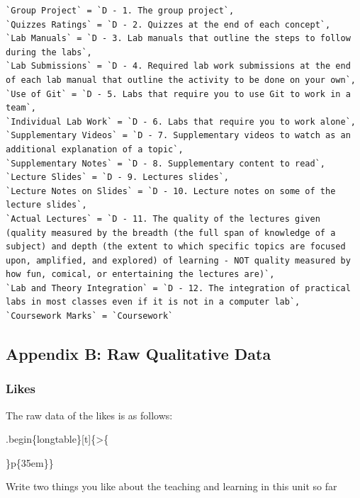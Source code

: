\documentclass[
]{article}
\begin{document}
\begin{verbatim}
`Group Project` = `D - 1. The group project`,
`Quizzes Ratings` = `D - 2. Quizzes at the end of each concept`,
`Lab Manuals` = `D - 3. Lab manuals that outline the steps to follow during the labs`,
`Lab Submissions` = `D - 4. Required lab work submissions at the end of each lab manual that outline the activity to be done on your own`,
`Use of Git` = `D - 5. Labs that require you to use Git to work in a team`,
`Individual Lab Work` = `D - 6. Labs that require you to work alone`,
`Supplementary Videos` = `D - 7. Supplementary videos to watch as an additional explanation of a topic`,
`Supplementary Notes` = `D - 8. Supplementary content to read`,
`Lecture Slides` = `D - 9. Lectures slides`,
`Lecture Notes on Slides` = `D - 10. Lecture notes on some of the lecture slides`,
`Actual Lectures` = `D - 11. The quality of the lectures given (quality measured by the breadth (the full span of knowledge of a subject) and depth (the extent to which specific topics are focused upon, amplified, and explored) of learning - NOT quality measured by how fun, comical, or entertaining the lectures are)`,
`Lab and Theory Integration` = `D - 12. The integration of practical labs in most classes even if it is not in a computer lab`,
`Coursework Marks` = `Coursework`
\end{verbatim}

\newpage

\subsection{Appendix B: Raw Qualitative
Data}\label{appendix-b-raw-qualitative-data}

\subsubsection{Likes}\label{likes}

The raw data of the likes is as follows:

.begin\{longtable\}{[}t{]}\{\textgreater\{

\raggedright

\arraybackslash\}p\{35em\}\}

\caption{\label{tab:RawLikesData}Write two things you like about the teaching and learning in this unit so far}
\end{document}
